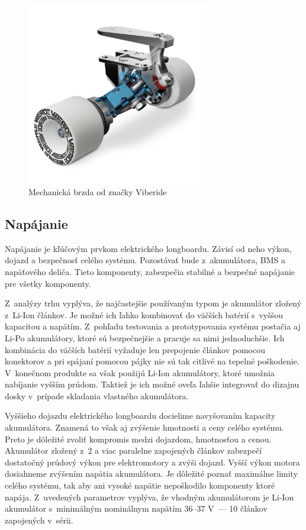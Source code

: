 \begin{figure}
    \centering
    \includegraphics[height=8cm]{figures/mechanic-brake.png}
    \caption{Mechanická brzda od značky Viberide\cite{Viberide}}\label{fig:mechanic-brake}
\end{figure}

\subsection{Napájanie}
Napájanie je kľúčovým prvkom elektrického longboardu.
Závisí od neho výkon, dojazd a bezpečnosť celého systému.
Pozostávať bude z~akumulátora, BMS a napäťového deliča.
Tieto komponenty, zabezpečia stabilné a bezpečné napájanie pre všetky komponenty.

Z~analýzy trhu vyplýva, že najčastejšie používaným typom je akumulátor zložený z~Li-Ion článkov.
Je možné ich ľahko kombinovať do väčších batérií s~vyššou kapacitou a napätím.
Z~pohľadu testovania a prototypovania systému postačia aj Li-Po akumulátory, ktoré sú bezpečnejšie a pracuje sa nimi jednoduchšie.
Ich kombinácia do väčších batérií vyžaduje len prepojenie článkov pomocou konektorov a pri spájaní pomocou pájky nie sú tak citlivé na tepelné poškodenie.
V~konečnom produkte sa však použijú Li-Ion akumulátory, ktoré umožnia nabíjanie vyšším prúdom. 
Taktiež je ich možné oveľa ľahšie integrovať do dizajnu dosky v~prípade skladania vlastného akumulátora.

Vyššieho dojazdu elektrického longboardu docielime navyšovaním kapacity akumulátora. 
Znamená to však aj zvýšenie hmotnosti a ceny celého systému.
Preto je dôležité zvoliť kompromis medzi dojazdom, hmotnosťou a cenou.
Akumulátor zložený z~2 a viac paralelne zapojených článkov zabezpečí dostatočný prúdový výkon pre elektromotory a zvýši dojazd.
Vyšší výkon motora dosiahneme zvýšením napätia akumulátora.
Je dôležité poznať maximálne limity celého systému, tak aby ani vysoké napätie nepoškodilo komponenty ktoré napája.
Z~uvedených parametrov vyplýva, že vhodným akumulátorom je Li-Ion akumulátor s~minimálným nominálnym napätím 36--37 V~--- 10 článkov zapojených v~sérii.

